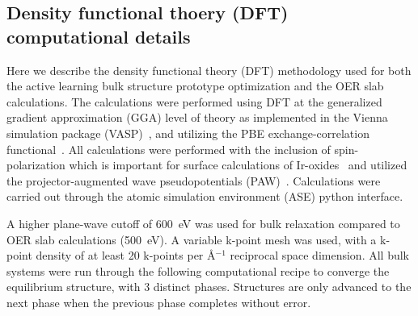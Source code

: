 


\subsection{Density functional thoery (DFT) computational details}

%
Here we describe the density functional theory (DFT) methodology used for both the active learning bulk structure prototype optimization and the OER slab calculations.
%
The calculations were performed using DFT at the generalized gradient approximation (GGA) level of theory as implemented in the Vienna  simulation package (VASP)~\cite{Kresse1995,Kresse1996_0,Kresse1996_1},
and utilizing the PBE exchange-correlation functional~\cite{Perdew1996}.
%
All calculations were performed with the inclusion of spin-polarization which is important for surface calculations of Ir-oxides~\cite{Briquet2017,Strickler2019} and utilized the projector-augmented wave pseudopotentials (PAW)~\cite{Blochl1994}.
%
Calculations were carried out through the atomic simulation environment (ASE) python interface.~\cite{HjorthLarsen2017}
%


%
%
A higher plane-wave cutoff of \SI{600}{\electronvolt} was used for bulk relaxation compared to OER slab calculations (\SI{500}{\electronvolt}).
%
A variable k-point mesh was used, with a k-point density of at least \num{20} k-points per \AA$^{-1}$ reciprocal space dimension.
%
All bulk systems were run through the following computational recipe to converge the equilibrium structure, with \num{3} distinct phases. Structures are only advanced to the next phase when the previous phase completes without error.

